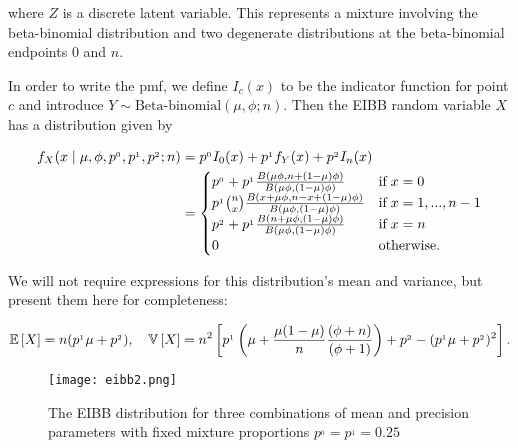where $Z$ is a discrete latent variable. This represents a mixture involving the beta-binomial distribution and two degenerate distributions at the beta-binomial endpoints $0$ and $n$.

In order to write the pmf, we define $I_c(x)$ to be the indicator function for point $c$ and introduce $Y \sim \text{Beta-binomial}(\mu, \phi; n)$. Then the EIBB random variable $X$ has a distribution given by

\begin{equation}
\begin{split}
f_{X}(x \mid \mu, \phi, p^{_0}, p^{_1}, p^{_2}; n)
&= p^{_0}I_0(x) + p^{_1} f_{Y}(x) + p^{_2}I_n(x)\\
&=	\begin{cases}
p^{_0} + p^{_1} {B(\mu\phi, n+(1-\mu)\phi) \over B(\mu\phi,(1-\mu)\phi)} & \text{if}\; x=0\\
p^{_1} {n \choose x} {B(x+\mu\phi, n-x+(1-\mu)\phi) \over B(\mu\phi,(1-\mu)\phi)} & \text{if}\; x=1,...,n-1\\
p^{_2} + p^{_1} {B(n+\mu\phi, (1-\mu)\phi) \over B(\mu\phi,(1-\mu)\phi)} & \text{if}\; x=n\\
0 & \text{otherwise.}
	\end{cases}
\end{split}
\label{densidad}
\end{equation}

We will not require expressions for this distribution's mean and variance, but present them here for completeness:

\begin{equation}
\begin{split}
{\mathbb E}\left[ X \right] = n(p^{_1}\mu + p^{_2}), \quad {\mathbb V}\left[ X \right] = n^2\left[ p^{_1}\left( \mu + \frac{ \mu(1-\mu)}{n}\frac{(\phi + n)}{(\phi+1)} \right) + p^{_2} - (p^{_1}\mu + p^{_2})^2\right].
\end{split}
\end{equation}

\begin{figure}
  \texttt{[image: eibb2.png]}
  \caption{The EIBB distribution for three combinations of mean and precision parameters with fixed mixture proportions $p^{_0} = p^{_1} = 0.25$}
  \label{fig:eibb}
\end{figure}
